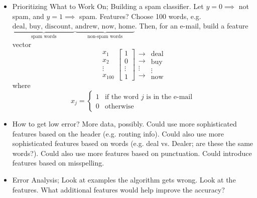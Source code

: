 \documentclass[10pt]{article}
\begin{document}
\begin{itemize}
  \item Prioritizing What to Work On; Building a spam classifier. Let
    $y=0 \implies$ not spam, and $y=1 \implies$ spam. Features? Choose
    100 words, e.g. $\underbrace{\text{deal, buy, discount,
    }}_{\text{spam words}} \underbrace{\text{andrew, now,
          home}}_{\text{non-spam words}}$. Then, for an e-mail, build a feature vector
    \begin{equation*}
      \begin{matrix} x_1 \\ x_2 \\ \vdots \\ x_{100} \end{matrix} 
      \begin{bmatrix}1 \\ 0 \\ \vdots \\ 1 \end{bmatrix}
      \begin{matrix} \rightarrow \\ \rightarrow \\ \vdots \\ \rightarrow \end{matrix} 
      \begin{matrix}\text{deal} \\ \text{buy} \\ \vdots \\ \text{now}\end{matrix}
    \end{equation*}
    where
    \begin{equation*}
      x_j = \begin{cases} 1 & \mbox{if the word } j \mbox{ is in the e-mail} \\ 0 & \mbox{otherwise }\end{cases}
    \end{equation*}
  \item How to get low error? More data, possibly. Could use more
    sophisticated features based on the header (e.g. routing
    info). Could also use more sophisticated features based on words
    (e.g. deal vs. Dealer; are these the same words?). Could also use
    more features based on punctuation. Could introduce features based on misspelling.
  \item Error Analysis; Look at examples the algorithm gets wrong. Look at the features. What additional features would help improve the accuracy?

\end{itemize}
\end{document}
